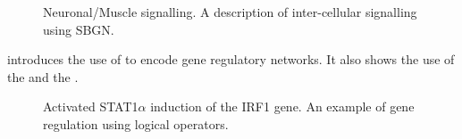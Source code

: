 \begin{figure}[htb]
\begin{center}
\caption{Neuronal/Muscle signalling. A description of inter-cellular signalling using SBGN.}\label{fig:muscle}
\end{center}
\end{figure}

 introduces the use of \SBGNPDLone to encode gene regulatory networks. It also shows the use of the  and the  .

\begin{figure}[htb]
\begin{center}
\caption{Activated STAT1$\alpha$ induction of the IRF1 gene. An example of gene regulation using logical operators.}\label{fig:IFN}
\end{center}
\end{figure}
